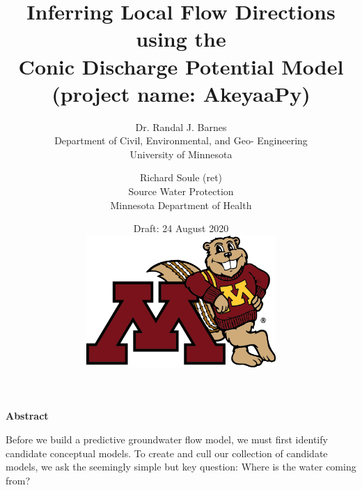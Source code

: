 \documentclass[12pt]{report}
\newcommand{\version}{Draft: 24 August 2020}
\begin{document}

\thispagestyle{empty}

\title{Inferring Local Flow Directions using the\\Conic Discharge Potential Model\\(project name: {\bf AkeyaaPy})}
\author{
Dr. Randal J. Barnes\\
Department of Civil, Environmental, and Geo- Engineering\\
University of Minnesota
\and
Richard Soule (ret)\\
Source Water Protection\\
Minnesota Department of Health\\
}

\date{\version
\\
\vspace{1.5in}
\includegraphics[height=5.0cm]{figures/goldyMout-RGB.png}
}
\maketitle
\thispagestyle{plain}


\null\vspace{1.0in}
\begin{center}
    \Large\bf{Abstract}
\end{center}

Before we build a predictive groundwater flow model, we must first identify candidate conceptual models. To create and cull our collection of candidate models, we ask the seemingly simple but key question: Where is the water coming from?
\end{document}
